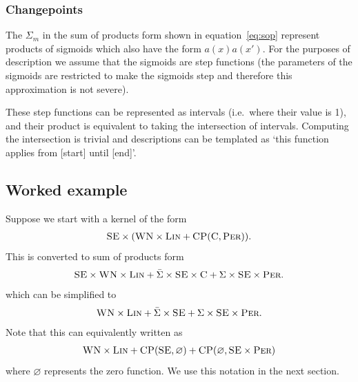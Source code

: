 \documentclass{article}
\def\ie{i.e.\ }
\let\emptyset\varnothing
\begin{document}
\subsubsection{Changepoints}

The $\Sigma_m$ in the sum of products form shown in equation~\eqref{eq:sop} represent products of sigmoids which also have the form $a(x)a(x')$.
For the purposes of description we assume that the sigmoids are step functions (the parameters of the sigmoids are restricted to make the sigmoids step and therefore this approximation is not severe).

These step functions can be represented as intervals (\ie where their value is 1), and their product is equivalent to taking the intersection of intervals.
Computing the intersection is trivial and descriptions can be templated as `this function applies from [start] until [end]'.

\subsection{Worked example}

Suppose we start with a kernel of the form
\begin{align*}
{\textsc{SE}} \times ({\textsc{WN}} \times {\textsc{Lin}} + {\textsc{CP}}({\textsc{C}}, {\textsc{Per}})).
\end{align*}
This is converted to sum of products form
\begin{align*}
{\textsc{SE}} \times {\textsc{WN}} \times {\textsc{Lin}} + \bar\Sigma\times{\textsc{SE}} \times {\textsc{C}} + \Sigma\times{\textsc{SE}} \times {\textsc{Per}}.
\end{align*}
which can be simplified to
\begin{align*}
{\textsc{WN}} \times {\textsc{Lin}} + \bar\Sigma\times{\textsc{SE}} + \Sigma\times{\textsc{SE}} \times {\textsc{Per}}.
\end{align*}
Note that this can equivalently written as
\begin{align*}
\kWN \times \kLin + \kCP(\kSE, \emptyset) + \kCP(\emptyset, \kSE \times \kPer)
\end{align*}
where $\emptyset$ represents the zero function.
We use this notation in the next section.

\end{document}
